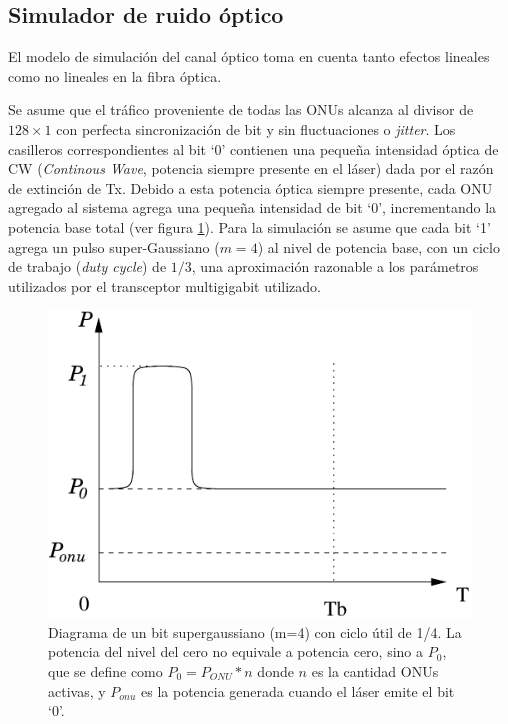 \subsection{Simulador de ruido óptico} 

El modelo de simulación del canal óptico toma en cuenta tanto efectos lineales como no lineales en la fibra óptica. 

Se asume que el tráfico proveniente de todas las ONUs alcanza al divisor de $128\times1$ con perfecta sincronización de bit y sin fluctuaciones o \textit{jitter}.
Los casilleros correspondientes al bit `0' contienen una pequeña intensidad óptica de CW (\textit{Continous Wave}, potencia siempre presente en el láser) dada por el razón de extinción de Tx.
Debido a esta potencia óptica siempre presente, cada ONU agregado al sistema agrega una pequeña intensidad de bit `0', incrementando la potencia base total (ver figura \ref{sim:extinction}).
Para la simulación se asume que cada bit `1' agrega un pulso super-Gaussiano ($m=4$) al nivel de potencia base, con un ciclo de trabajo (\textit{duty cycle}) de $1/3$, una aproximación razonable a los parámetros utilizados por el transceptor multigigabit utilizado.

\begin{figure}[!t]
    \centering
      \includegraphics[width=3.5 in]{graphs/extinction.pdf}
      \caption{Diagrama de un bit supergaussiano (m=4) con ciclo útil de 1/4. La potencia del nivel del cero no equivale a potencia cero, sino a $P_0$, que se define como $P_0=P_{ONU}*n$ donde $n$ es la cantidad ONUs activas, y $P_{onu}$ es la potencia generada cuando el láser emite el bit `0'.}
      \label{sim:extinction}
\end{figure}

